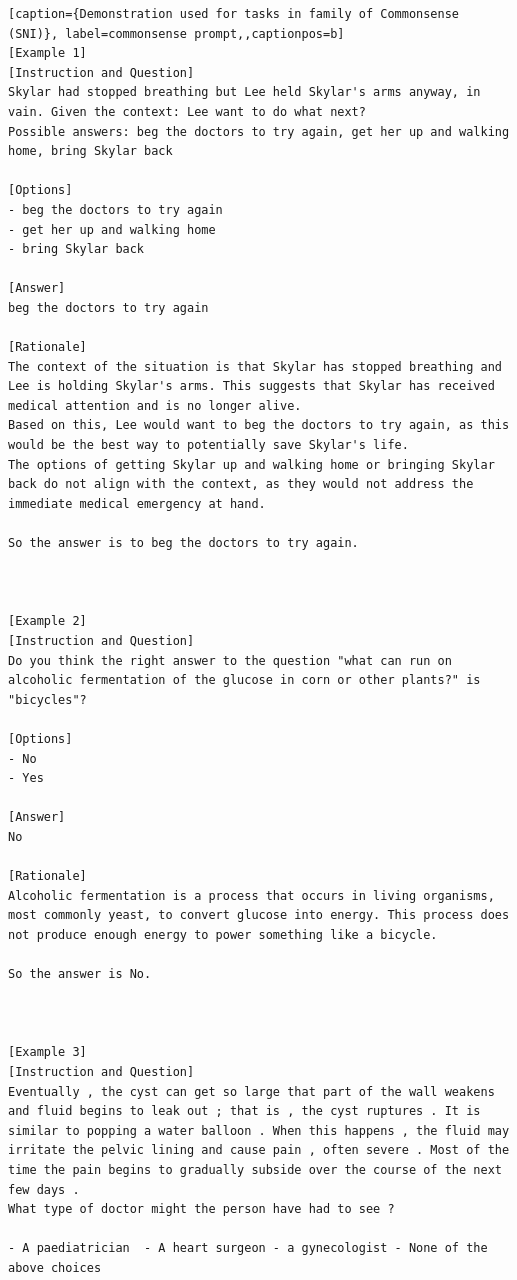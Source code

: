 \begin{lstlisting}[caption={Demonstration used for tasks in family of Commonsense (SNI)}, label=commonsense prompt,,captionpos=b]
[Example 1]
[Instruction and Question]
Skylar had stopped breathing but Lee held Skylar's arms anyway, in vain. Given the context: Lee want to do what next?
Possible answers: beg the doctors to try again, get her up and walking home, bring Skylar back

[Options]
- beg the doctors to try again
- get her up and walking home
- bring Skylar back

[Answer]
beg the doctors to try again

[Rationale]
The context of the situation is that Skylar has stopped breathing and Lee is holding Skylar's arms. This suggests that Skylar has received medical attention and is no longer alive.
Based on this, Lee would want to beg the doctors to try again, as this would be the best way to potentially save Skylar's life. 
The options of getting Skylar up and walking home or bringing Skylar back do not align with the context, as they would not address the immediate medical emergency at hand.

So the answer is to beg the doctors to try again.



[Example 2]
[Instruction and Question]
Do you think the right answer to the question "what can run on alcoholic fermentation of the glucose in corn or other plants?" is "bicycles"?

[Options]
- No
- Yes

[Answer]
No

[Rationale]
Alcoholic fermentation is a process that occurs in living organisms, most commonly yeast, to convert glucose into energy. This process does not produce enough energy to power something like a bicycle.

So the answer is No.



[Example 3]
[Instruction and Question]
Eventually , the cyst can get so large that part of the wall weakens and fluid begins to leak out ; that is , the cyst ruptures . It is similar to popping a water balloon . When this happens , the fluid may irritate the pelvic lining and cause pain , often severe . Most of the time the pain begins to gradually subside over the course of the next few days .
What type of doctor might the person have had to see ?

- A paediatrician  - A heart surgeon - a gynecologist - None of the above choices


\end{lstlisting}
